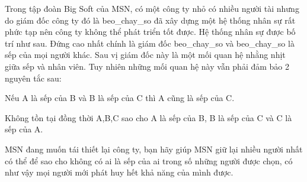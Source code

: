 Trong tập đoàn Big Soft của MSN, có một công ty nhỏ có nhiều người tài nhưng do giám đốc công ty đó là beo\_chay\_so đã xây dựng một hệ thống nhân sự rất phức tạp nên công ty không thể phát triển tốt được. Hệ thống nhân sự được bố trí như sau. Đứng cao nhất chính là giám đốc beo\_chay\_so và beo\_chay\_so là sếp của mọi người khác. Sau vị giám đốc này là một mối quan hệ nhằng nhịt giữa sếp và nhân viên. Tuy nhiên những mối quan hệ này vẫn phải đảm bảo 2 nguyên tắc sau:  

   Nếu A là sếp của B và B là sếp của C thì A cũng là sếp của C.  

   Không tồn tại đồng thời A,B,C sao cho A là sếp của B, B là sếp của C và C là sếp của A.  

   MSN đang muốn tái thiết lại công ty, bạn hãy giúp MSN giữ lại nhiều người nhất có thể để sao cho không có ai là sếp của ai trong số những người được chọn, có như vậy mọi người mới phát huy hết khả năng của mình được.  

\